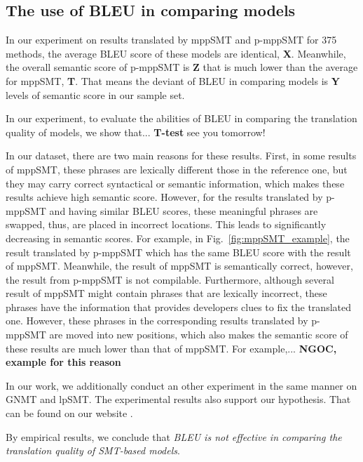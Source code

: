 \subsection{The use of BLEU in comparing models}
In our experiment on results translated by mppSMT and p-mppSMT for 375 methods, 
the average BLEU score of these models are identical, \textbf{X}. Meanwhile, 
the overall semantic score of p-mppSMT is \textbf{Z} that is much lower than the 
average for mppSMT, \textbf{T}. That means the deviant of BLEU in comparing 
models is \textbf{Y} levels of semantic score in our sample set. 

In our experiment, to evaluate the abilities of BLEU in comparing the 
translation quality of models, we show that... \textbf{T-test} see you tomorrow!

In our dataset, there are two main reasons for these results. First,
in some results of mppSMT, these phrases are lexically different those
in the reference one, but they may carry correct syntactical or
semantic information, which makes these results achieve high semantic
score. However, for the results translated by p-mppSMT and having
similar BLEU scores, these meaningful phrases are swapped, thus, are
placed in incorrect locations. This leads to significantly decreasing
in semantic scores. For example, in Fig.~\ref{fig:mppSMT_example}, the
result translated by p-mppSMT which has the same BLEU score with the
result of mppSMT. Meanwhile, the result of mppSMT is semantically
correct, however, the result from p-mppSMT is not compilable.
%
Furthermore, although several result of mppSMT might contain phrases
that are lexically incorrect, these phrases have the information that
provides developers clues to fix the translated one. However, these
phrases in the corresponding results translated by p-mppSMT are moved
into new positions, which also makes the semantic score of these
results are much lower than that of mppSMT. For example,...
\textbf{NGOC, example for this reason}

In our work, we additionally conduct an other experiment in the same
manner on GNMT and lpSMT.  The experimental results also support our
hypothesis. That can be found on our website \cite{??}.

By empirical results, we conclude that \textit{BLEU is not effective
  in comparing the translation quality of SMT-based models}.



